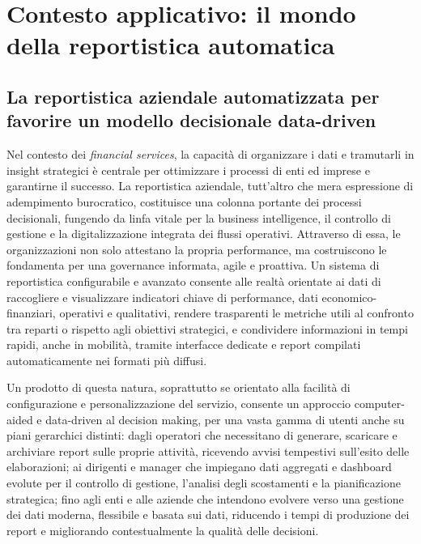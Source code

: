 \chapter{Contesto applicativo: il mondo della reportistica automatica}
\section{La reportistica aziendale automatizzata per favorire un modello decisionale data-driven}
Nel contesto dei \emph{financial services}, la capacità di organizzare i dati e tramutarli in insight strategici è centrale per ottimizzare i processi di enti ed imprese e garantirne il successo.
La reportistica aziendale, tutt'altro che mera espressione di adempimento burocratico, costituisce una colonna portante dei processi decisionali, fungendo da linfa vitale per la business intelligence, il controllo di gestione e la digitalizzazione integrata dei flussi operativi.
Attraverso di essa, le organizzazioni non solo attestano la propria performance, ma costruiscono le fondamenta per una governance informata, agile e proattiva.
Un sistema di reportistica configurabile e avanzato consente alle realtà orientate ai dati di raccogliere e visualizzare indicatori chiave di performance, dati economico-finanziari, operativi e qualitativi, rendere trasparenti le metriche utili al confronto tra reparti o rispetto agli obiettivi strategici, e condividere informazioni in tempi rapidi, anche in mobilità, tramite interfacce dedicate e report compilati automaticamente nei formati più diffusi.

Un prodotto di questa natura, soprattutto se orientato alla facilità di configurazione e  personalizzazione del servizio\footnotemark, consente un approccio computer-aided e data-driven al decision making, per una vasta gamma di utenti anche su piani gerarchici distinti: dagli operatori che necessitano di generare, scaricare e archiviare report sulle proprie attività, ricevendo avvisi tempestivi sull’esito delle elaborazioni; ai dirigenti e manager che impiegano dati aggregati e dashboard evolute per il controllo di gestione, l’analisi degli scostamenti e la pianificazione strategica; fino agli enti e alle aziende che intendono evolvere verso una gestione dei dati moderna, flessibile e basata sui dati, riducendo i tempi di produzione dei report e migliorando contestualmente la qualità delle decisioni.


